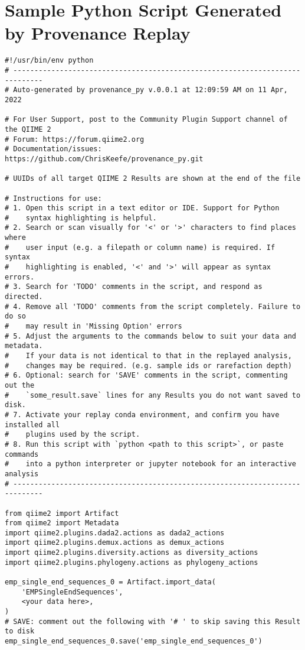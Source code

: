 \chapter{Sample Python Script Generated by Provenance Replay}
\label{app:PythonScript}

\begin{footnotesize}
\begin{verbatim}
#!/usr/bin/env python
# -----------------------------------------------------------------------------
# Auto-generated by provenance_py v.0.0.1 at 12:09:59 AM on 11 Apr, 2022

# For User Support, post to the Community Plugin Support channel of the QIIME 2
# Forum: https://forum.qiime2.org
# Documentation/issues: https://github.com/ChrisKeefe/provenance_py.git

# UUIDs of all target QIIME 2 Results are shown at the end of the file

# Instructions for use:
# 1. Open this script in a text editor or IDE. Support for Python
#    syntax highlighting is helpful.
# 2. Search or scan visually for '<' or '>' characters to find places where
#    user input (e.g. a filepath or column name) is required. If syntax
#    highlighting is enabled, '<' and '>' will appear as syntax errors.
# 3. Search for 'TODO' comments in the script, and respond as directed.
# 4. Remove all 'TODO' comments from the script completely. Failure to do so
#    may result in 'Missing Option' errors
# 5. Adjust the arguments to the commands below to suit your data and metadata.
#    If your data is not identical to that in the replayed analysis,
#    changes may be required. (e.g. sample ids or rarefaction depth)
# 6. Optional: search for 'SAVE' comments in the script, commenting out the
#    `some_result.save` lines for any Results you do not want saved to disk.
# 7. Activate your replay conda environment, and confirm you have installed all
#    plugins used by the script.
# 8. Run this script with `python <path to this script>`, or paste commands
#    into a python interpreter or jupyter notebook for an interactive analysis
# -----------------------------------------------------------------------------

from qiime2 import Artifact
from qiime2 import Metadata
import qiime2.plugins.dada2.actions as dada2_actions
import qiime2.plugins.demux.actions as demux_actions
import qiime2.plugins.diversity.actions as diversity_actions
import qiime2.plugins.phylogeny.actions as phylogeny_actions

emp_single_end_sequences_0 = Artifact.import_data(
    'EMPSingleEndSequences',
    <your data here>,
)
# SAVE: comment out the following with '# ' to skip saving this Result to disk
emp_single_end_sequences_0.save('emp_single_end_sequences_0')


\end{verbatim}
\end{footnotesize}
